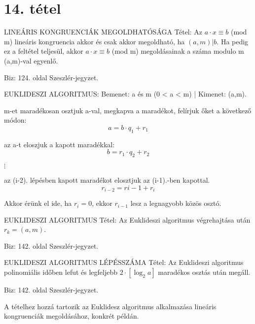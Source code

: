 \section{14. tétel}

\begin{tetel}{
LINEÁRIS KONGRUENCIÁK MEGOLDHATÓSÁGA Tétel}: Az $a \cdot x \equiv b$ (mod m) lineáris kongruencia akkor és csak akkor megoldható, ha $(a,m)|b$. Ha pedig ez a feltétel teljesül, akkor  $a \cdot x \equiv b$ (mod m) megoldásainak a száma modulo m (a,m)-val egyenlő.
\end{tetel}
\begin{leftbar}
Biz: 124. oldal Szeszlér-jegyzet.
\end{leftbar}
\begin{tetel}{
EUKLIDESZI ALGORITMUS}: Bemenet: a és m (0 < a < m) | Kimenet: (a,m).
\begin{description}
\item[1. lépés:]m-et maradékosan osztjuk a-val, megkapva a maradékot, felírjuk őket a következő módon:
$$a = b\cdot q_1 + r_1$$
\item[2. lépés:]az a-t eloszjuk a kapott maradékkal:
$$b = r_1\cdot q_2 + r_2$$
\item $\vdots$
\item[i. lépés:] az (i-2). lépésben kapott maradékot elosztjuk az (i-1).-ben kapottal.
$$r_{i-2} = r{i-1} + r_i$$
\item[Utolsó lépés] Akkor érünk el ide, ha $r_i = 0$, ekkor $r_{i-1}$ lesz a legnagyobb közös osztó.
\end{description}
\end{tetel}
\begin{tetel}{
EUKLIDESZI ALGORITMUS Tétel}: Az Euklideszi algoritmus végrehajtása után $r_k = (a,m)$.
\end{tetel}
\begin{leftbar}
Biz: 142. oldal Szeszlér-jegyzet.
\end{leftbar}
\begin{tetel}{
EUKLIDESZI ALGORITMUS LÉPÉSSZÁMA Tétel}: Az Euklideszi algoritmus polinomiális időben lefut és legfeljebb $2 \cdot [\log_2a]$ maradékos osztás után megáll.
\end{tetel}
\begin{leftbar}
Biz: 142. oldal Szeszlér-jegyzet.
\end{leftbar}
A tételhez hozzá tartozik az Euklidesz algoritmus alkalmazása lineáris kongruenciák megoldásához, konkrét példán.
